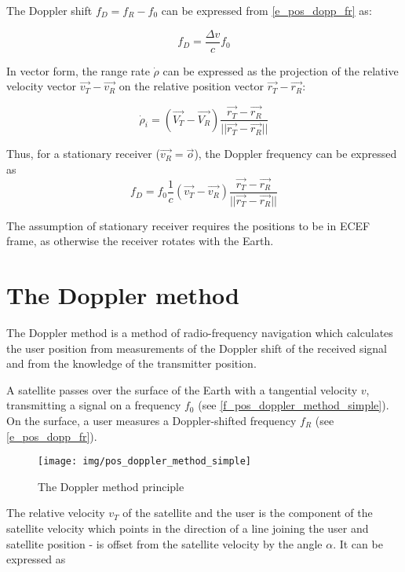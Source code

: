 The Doppler shift $f_D = f_R - f_0$ can be expressed from \autoref{e_pos_dopp_fr} as:

\begin{equation}
\label{e_pos_dopp_fd}
f_D = \frac{\Delta v}{c} f_0 
\end{equation}

In vector form, the range rate $\dot\rho$ can be expressed as the projection of the relative velocity vector $\Vec{v_T} - \Vec{v_R}$ on the relative position vector $\Vec{r_T} - \Vec{r_R}$:

\begin{equation}
    \label{e_pos_range_rate}
    \dot\rho_i = (\Vec{V_T} - \Vec{V_R}) \frac{\Vec{r_T} - \Vec{r_R}}{||\Vec{r_T} - \Vec{r_R}||}
\end{equation}

Thus, for a stationary receiver ($\Vec{v_R} = \Vec{o}$), the Doppler frequency can be expressed as
\begin{equation}
    \label{e_pos_dopp_shift}
    f_D = f_0 \frac{1}{c} (\Vec{v_T} - \Vec{v_R}) \frac{\Vec{r_T} - \Vec{r_R}}{||\Vec{r_T} - \Vec{r_R}||}
\end{equation}

The assumption of stationary receiver requires the positions to be in ECEF frame, as otherwise the receiver rotates with the Earth.



\section{The Doppler method}
\label{s_pos_doppler_method}
The Doppler method is a method of radio-frequency navigation which calculates the user position from measurements of the Doppler shift of the received signal and from the knowledge of the transmitter position.

A satellite passes over the surface of the Earth with a tangential velocity $v$, transmitting a signal on a frequency $f_0$ (see \autoref{f_pos_doppler_method_simple}). On the surface, a user measures a Doppler-shifted frequency $f_R$ (see \autoref{e_pos_dopp_fr}).

\begin{figure}
    \centering
    \texttt{[image: img/pos\_doppler\_method\_simple]}
    \caption{The Doppler method principle}
    \label{f_pos_doppler_method_simple}
\end{figure}

The relative velocity $v_T$ of the satellite and the user is the component of the satellite velocity which points in the direction of a line joining the user and satellite position - is offset from the satellite velocity by the angle $\alpha$. It can be expressed as

